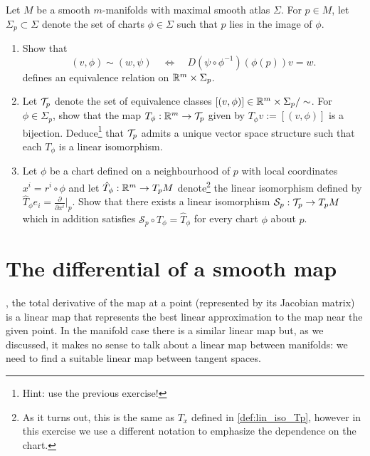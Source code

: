 \begin{exercise}
Let $M$ be a smooth $m$-manifolds with maximal smooth atlas $\Sigma$.
For $p\in M$, let $\Sigma_p \subset \Sigma$ denote the set of charts $\phi\in\Sigma$ such that $p$ lies in the image of $\phi$.
\begin{enumerate}
  \item Show that
  \begin{equation}
    (v,\phi) \sim (w, \psi)
    \quad\Longleftrightarrow\quad
    D(\psi \circ \phi^{-1})(\phi(p))v = w.
  \end{equation}
  defines an equivalence relation on $\mathbb{R}^m\times\Sigma_p$.
  \item Let $\mathcal{T}_p$ denote the set of equivalence classes $[(v,\phi)]\in \mathbb{R}^m\times\Sigma_p/\sim$. For $\phi\in\Sigma_p$, show that the map $T_\phi:\mathbb{R}^m\to\mathcal{T}_p$ given by $T_\phi v := [(v,\phi)]$ is a bijection.
  Deduce\footnote{Hint: use the previous exercise!} that $\mathcal{T}_p$ admits a unique vector space structure such that each $T_\phi$ is a linear isomorphism.
  \item Let $\phi$ be a chart defined on a neighbourhood of $p$ with local coordinates $x^i = r^i \circ \phi$ and let $\hat T_\phi :\mathbb{R}^m \to T_pM$ denote\footnote{As it turns out, this is the same as $T_x$ defined in \eqref{def:lin_iso_Tp}, however in this exercise we use a different notation to emphasize the dependence on the chart.} the linear isomorphism defined by $\hat T_\phi e_i = \frac{\partial}{\partial x^i}\big|_p$.
  Show that there exists a linear isomorphism $\mathcal{S}_p:\mathcal{T}_p\to T_pM$ which in addition satisfies $\mathcal{S}_p \circ T_\phi = \hat T_\phi$ for every chart $\phi$ about $p$.
\end{enumerate}
\end{exercise}

\section{The differential of a smooth map}\label{sec:diffsmooth}

, the total derivative of the map at a point (represented by its Jacobian matrix) is a linear map that represents the best linear approximation to the map near the given point.
In the manifold case there is a similar linear map but, as we discussed, it makes no sense to talk about a linear map between manifolds: we need to find a suitable linear map between tangent spaces.


